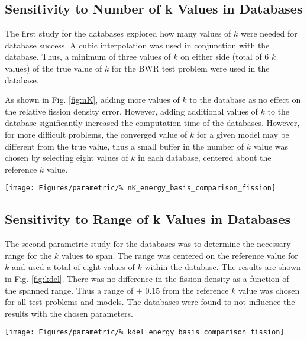 \subsection{Sensitivity to Number of k Values in Databases}

The first study for the databases explored how many values of $k$ were needed 
for database success.  A cubic interpolation was used in conjunction with the 
database.  Thus, a minimum of three values of $k$ on either side (total of 6 
$k$ values) of the true value of $k$ for the BWR test problem were used in the 
database.  

As shown in Fig. \ref{fig:nK}, adding more values of $k$ to the database as no 
effect on the relative fission density error.  However, adding additional 
values of $k$ to the database significantly increased the computation time of 
the databases.  However, for more difficult problems, the converged value of 
$k$ for a given model may be different from the true value, thus a small buffer 
in the number of $k$ value was chosen by selecting eight values of $k$ in each 
database, centered about the reference $k$ value.

\begin{figure*}[tb]
    \centering
    \texttt{[image: Figures/parametric/\%
        nK\_energy\_basis\_comparison\_fission]}
    \caption{Relative error for 238-group, BWR test problem a database of 
responses filled with a number of $k$ values as indicated by the legend.  The 
values spanned the range of $\pm0.15$ of the the true value of $k$.  The number 
of $k$ values had no effect of the results.}
    \label{fig:nK}
\end{figure*}

\subsection{Sensitivity to Range of k Values in Databases}

The second parametric study for the databases was to determine the necessary 
range for the $k$ values to span.  The range was centered on the reference 
value for $k$ and used a total of eight values of $k$ within the database. The 
results are shown in Fig. \ref{fig:kdel}.  There was no difference in the 
fission density as a function of the spanned range.  Thus a range of $\pm$ 0.15 
from the reference $k$ value was chosen for all test problems and models.  The 
databases were found to not influence the results with the chosen parameters.

\begin{figure*}[tb]
    \centering
    \texttt{[image: Figures/parametric/\%
        kdel\_energy\_basis\_comparison\_fission]}
    \caption{Relative error for 238-group, BWR test problem a database of 
        responses filled with eight $k$ values. The 
        values spanned the range of $\pm$ the value in the legend of the the 
true value of $k$.  The size of the range no effect of the results.}
    \label{fig:kdel}
\end{figure*}
